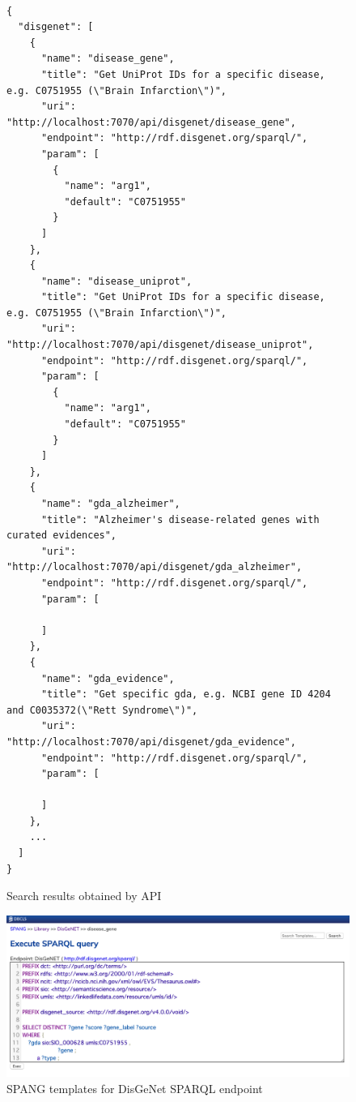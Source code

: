 \documentclass[runningheads]{llncs}
\begin{document}
\begin{figure}[!t]
\begin{scriptsize}
\begin{verbatim}

{
  "disgenet": [
    {
      "name": "disease_gene",
      "title": "Get UniProt IDs for a specific disease, e.g. C0751955 (\"Brain Infarction\")",
      "uri": "http://localhost:7070/api/disgenet/disease_gene",
      "endpoint": "http://rdf.disgenet.org/sparql/",
      "param": [
        {
          "name": "arg1",
          "default": "C0751955"
        }
      ]
    },
    {
      "name": "disease_uniprot",
      "title": "Get UniProt IDs for a specific disease, e.g. C0751955 (\"Brain Infarction\")",
      "uri": "http://localhost:7070/api/disgenet/disease_uniprot",
      "endpoint": "http://rdf.disgenet.org/sparql/",
      "param": [
        {
          "name": "arg1",
          "default": "C0751955"
        }
      ]
    },
    {
      "name": "gda_alzheimer",
      "title": "Alzheimer's disease-related genes with curated evidences",
      "uri": "http://localhost:7070/api/disgenet/gda_alzheimer",
      "endpoint": "http://rdf.disgenet.org/sparql/",
      "param": [

      ]
    },
    {
      "name": "gda_evidence",
      "title": "Get specific gda, e.g. NCBI gene ID 4204 and C0035372(\"Rett Syndrome\")",
      "uri": "http://localhost:7070/api/disgenet/gda_evidence",
      "endpoint": "http://rdf.disgenet.org/sparql/",
      "param": [

      ]
    },
    ...
  ]
}

\end{verbatim}
\end{scriptsize}
\caption{Search results obtained by API}
\label{fig:lib-api-out}
\end{figure}


\begin{figure}
\center
\includegraphics[width=1.0\textwidth]{spang_disease_gene_query.png}
\caption{SPANG templates for DisGeNet SPARQL endpoint}
\label{fig:spang_disease_gene_query}
\end{figure}
\end{document}

